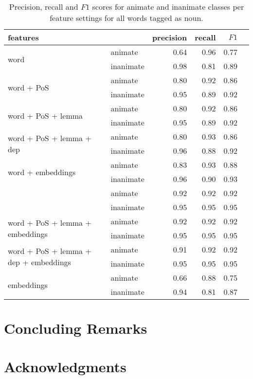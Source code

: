 \documentclass[a4paper, twocolumn, 11pt]{article}
\begin{document}
\begin{table*}
\centering
\begin{tabular}{llrrrr}
\toprule
features                                               &           & precision & recall & $F1$ \\ \midrule
\multirow{2}{*}{word}                                  & animate   & 0.64      & 0.96   & 0.77 \\
                                                       & inanimate & 0.98      & 0.81   & 0.89 \\
\multirow{2}{*}{word + PoS}                            & animate   & 0.80      & 0.92   & 0.86 \\
                                                       & inanimate & 0.95      & 0.89   & 0.92 \\
\multirow{2}{*}{word + PoS + lemma}                    & animate   & 0.80      & 0.92   & 0.86 \\
                                                       & inanimate & 0.95      & 0.89   & 0.92 \\
\multirow{2}{*}{word + PoS + lemma + dep}              & animate   & 0.80      & 0.93   & 0.86 \\
                                                       & inanimate & 0.96      & 0.88   & 0.92 \\
\multirow{2}{*}{word + embeddings}                     & animate   & 0.83      & 0.93   & 0.88 \\
                                                       & inanimate & 0.96      & 0.90   & 0.93 \\
\rowcolor{Gray}                                        & animate   & 0.92      & 0.92   & 0.92 \\
\rowcolor{Gray}\multirow{-2}{*}{word + PoS + embeddings} & inanimate & 0.95    & 0.95   & 0.95 \\
\multirow{2}{*}{word + PoS + lemma + embeddings}       & animate   & 0.92      & 0.92   & 0.92 \\
                                                       & inanimate & 0.95      & 0.95   & 0.95 \\
\multirow{2}{*}{word + PoS + lemma + dep + embeddings} & animate   & 0.91      & 0.92   & 0.92 \\
                                                       & inanimate & 0.95      & 0.95   & 0.95 \\
\multirow{2}{*}{embeddings}                            & animate   & 0.66      & 0.88   & 0.75 \\
                                                       & inanimate & 0.94      & 0.81   & 0.87 \\

\bottomrule
\end{tabular}
\caption{Precision, recall and $F1$ scores for animate and inanimate classes per feature settings for all words tagged
as noun.}
\label{tab:results-noun}
\end{table*}
\section{Concluding Remarks}

\section*{Acknowledgments}



\end{document}
